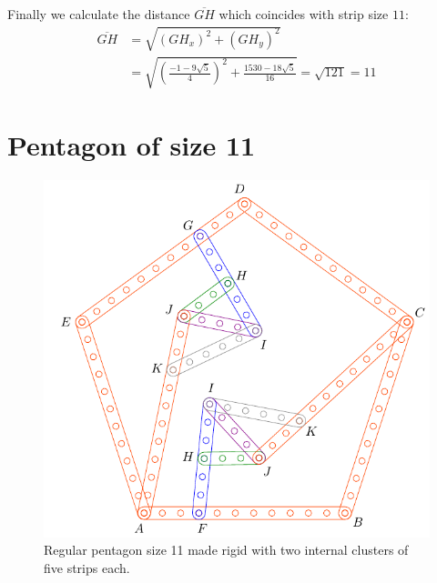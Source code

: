 \documentclass[11pt]{article}
\begin{document}
Finally we calculate the distance $\overline{GH}$ which coincides with strip size $11$:
\begin{align}
\overline{GH} &= \sqrt{(GH_x)^2 + (GH_y)^2}\nonumber\\
 &= \sqrt{\left(\frac{-1-9\sqrt5}{4}\right)^2 + \frac{1530-18\sqrt5}{16}}%
 = \sqrt{121} = 11
\end{align}


\section{Pentagon of size 11}

\begin{figure}[h]
 \centering
 \includegraphics[scale=1]{11/penta11a}
 \caption{Regular pentagon size 11 made rigid with two internal clusters of five strips each.}
 \label{fig:penta11a}
\end{figure}
\end{document}
